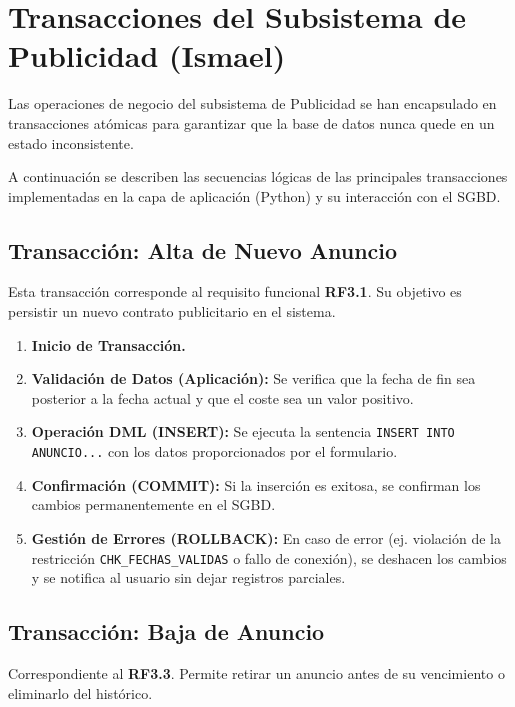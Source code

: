 \section{Transacciones del Subsistema de Publicidad (Ismael)}

Las operaciones de negocio del subsistema de Publicidad se han encapsulado en transacciones atómicas para garantizar que la base de datos nunca quede en un estado inconsistente.

A continuación se describen las secuencias lógicas de las principales transacciones implementadas en la capa de aplicación (Python) y su interacción con el SGBD.

\subsection{Transacción: Alta de Nuevo Anuncio}
Esta transacción corresponde al requisito funcional \textbf{RF3.1}. Su objetivo es persistir un nuevo contrato publicitario en el sistema.

\begin{enumerate}
    \item \textbf{Inicio de Transacción.}
    \item \textbf{Validación de Datos (Aplicación):} Se verifica que la fecha de fin sea posterior a la fecha actual y que el coste sea un valor positivo.
    \item \textbf{Operación DML (INSERT):} Se ejecuta la sentencia \texttt{INSERT INTO ANUNCIO...} con los datos proporcionados por el formulario.
    \item \textbf{Confirmación (COMMIT):} Si la inserción es exitosa, se confirman los cambios permanentemente en el SGBD.
    \item \textbf{Gestión de Errores (ROLLBACK):} En caso de error (ej. violación de la restricción \texttt{CHK\_FECHAS\_VALIDAS} o fallo de conexión), se deshacen los cambios y se notifica al usuario sin dejar registros parciales.
\end{enumerate}

\subsection{Transacción: Baja de Anuncio}
Correspondiente al \textbf{RF3.3}. Permite retirar un anuncio antes de su vencimiento o eliminarlo del histórico.

